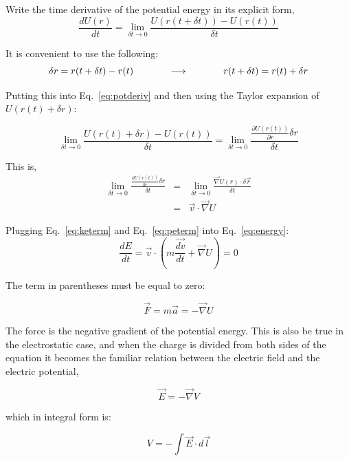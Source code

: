 \documentclass[12pt]{article}
\begin{document}
\begin{flushleft}
Write the time derivative of the potential energy in its explicit form,
\begin{equation}
\frac{dU(r)}{dt} = \lim_{\delta t \rightarrow 0} \frac{U(r(t+\delta t))-U(r(t))}{\delta t}
\label{eq:potderiv}
\end{equation}

It is convenient to use the following:
\[
\delta r = r(t+\delta t) - r(t) \hspace{.5in} \longrightarrow \hspace{.5in}  r(t+\delta t) = r(t) + \delta r
\] 

Putting this into Eq.~\ref{eq:potderiv} and then using the Taylor expansion of $U(r(t)+\delta r)$:

\[
\lim_{\delta t \rightarrow 0} \frac{U(r(t)+\delta r)-U(r(t))}{\delta t}  = \lim_{\delta t \rightarrow 0} \frac{ \frac{\partial U(r(t))}{\partial r} \delta r}{\delta t}
\]

This is,
\begin{eqnarray}
\lim_{\delta t \rightarrow 0} \frac{ \frac{\partial U(r(t))}{\partial r} \delta r}{\delta t}
  & = & \lim_{\delta t \rightarrow 0} \frac{ \vec{\nabla}U(r) \cdot \delta \vec{r}}{\delta t} \nonumber \\
 & = & \vec{v} \cdot \vec{\nabla}U \label{eq:peterm}
\end{eqnarray}

Plugging Eq.~\ref{eq:keterm} and Eq.~\ref{eq:peterm} into Eq.~\ref{eq:energy}:
\[
\frac{dE}{dt} = \vec{v} \cdot \left(  m\frac{\vec{dv}}{dt}  + \vec{\nabla}U  \right) = 0
\]

The term in parentheses must be equal to zero:

\[
\vec{F} = m\vec{a} = -\vec{\nabla}U 
\]

The force is the negative gradient of the potential energy.  This is also be true in the electrostatic case, and when the charge is divided from both sides of the equation it becomes the familiar relation between the electric field and the electric potential,

\[
\vec{E}  = -\vec{\nabla}V 
\]

which in integral form is:

\[
V = -\int \vec{E}\cdot d\vec{l} 
\]

\end{flushleft}
\end{document}
